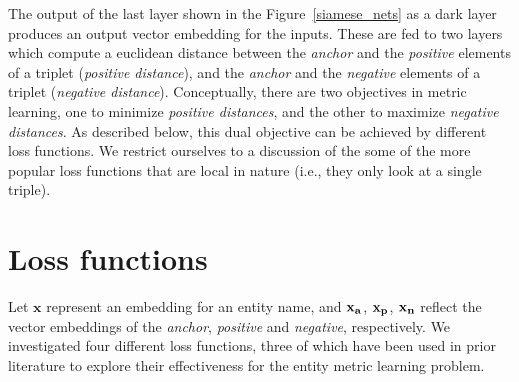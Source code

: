 



The output of the last layer shown in the Figure~\ref{siamese_nets} as a dark layer produces an output vector embedding for the inputs.  These are fed to two layers which compute a euclidean distance between the \textit{anchor} and the \textit{positive} elements of a triplet (\textit{positive distance}), and the \textit{anchor} and the \textit{negative} elements of a triplet (\textit{negative distance}).  Conceptually, there are two objectives in metric learning, one to minimize \textit{positive distances}, and the other to maximize \textit{negative distances}.  As described below, this dual objective can be achieved by different loss functions.  We restrict ourselves to a discussion of the some of the more popular loss functions that are local in nature (i.e., they only look at a single triple).  

\section{Loss functions}
\label{loss_functions}

Let $\mathbf{x}$ represent an embedding for an entity name, and $\bf{x_{a}}$, $\bf{x_{p}}$, $\bf{x_{n}}$ reflect the vector embeddings of the \textit{anchor}, \textit{positive} and \textit{negative}, respectively.  We investigated four different loss functions, three of which have been used in prior literature to explore their effectiveness for the entity metric learning problem.


